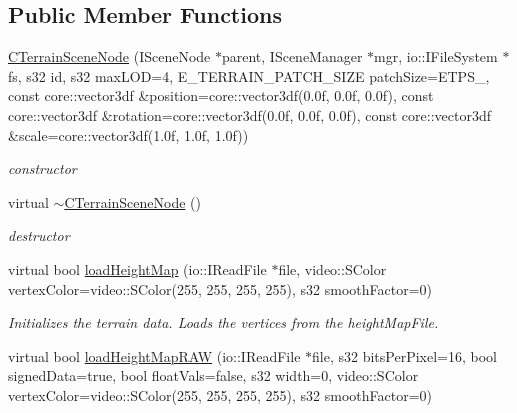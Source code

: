 \subsection*{Public Member Functions}
\begin{DoxyCompactItemize}
\item 
\hyperlink{classirr_1_1scene_1_1_c_terrain_scene_node_abf0c2423999b9658f9ad1e3bba086720}{C\-Terrain\-Scene\-Node} (I\-Scene\-Node $\ast$parent, I\-Scene\-Manager $\ast$mgr, io\-::\-I\-File\-System $\ast$fs, s32 id, s32 max\-L\-O\-D=4, E\-\_\-\-T\-E\-R\-R\-A\-I\-N\-\_\-\-P\-A\-T\-C\-H\-\_\-\-S\-I\-Z\-E patch\-Size=E\-T\-P\-S\-\_, const core\-::vector3df \&position=core\-::vector3df(0.\-0f, 0.\-0f, 0.\-0f), const core\-::vector3df \&rotation=core\-::vector3df(0.\-0f, 0.\-0f, 0.\-0f), const core\-::vector3df \&scale=core\-::vector3df(1.\-0f, 1.\-0f, 1.\-0f))
\begin{DoxyCompactList}\small\item\em constructor \end{DoxyCompactList}\item 
\hypertarget{classirr_1_1scene_1_1_c_terrain_scene_node_ac0d97bfc9ff0cf8201bc1121d1172d7b}{virtual \hyperlink{classirr_1_1scene_1_1_c_terrain_scene_node_ac0d97bfc9ff0cf8201bc1121d1172d7b}{$\sim$\-C\-Terrain\-Scene\-Node} ()}\label{classirr_1_1scene_1_1_c_terrain_scene_node_ac0d97bfc9ff0cf8201bc1121d1172d7b}

\begin{DoxyCompactList}\small\item\em destructor \end{DoxyCompactList}\item 
\hypertarget{classirr_1_1scene_1_1_c_terrain_scene_node_ae3734e983126fd07beb8e769589162c2}{virtual bool \hyperlink{classirr_1_1scene_1_1_c_terrain_scene_node_ae3734e983126fd07beb8e769589162c2}{load\-Height\-Map} (io\-::\-I\-Read\-File $\ast$file, video\-::\-S\-Color vertex\-Color=video\-::\-S\-Color(255, 255, 255, 255), s32 smooth\-Factor=0)}\label{classirr_1_1scene_1_1_c_terrain_scene_node_ae3734e983126fd07beb8e769589162c2}

\begin{DoxyCompactList}\small\item\em Initializes the terrain data. Loads the vertices from the height\-Map\-File. \end{DoxyCompactList}\item 
\hypertarget{classirr_1_1scene_1_1_c_terrain_scene_node_a05faa690ac383a121808e926bbd24a1f}{virtual bool \hyperlink{classirr_1_1scene_1_1_c_terrain_scene_node_a05faa690ac383a121808e926bbd24a1f}{load\-Height\-Map\-R\-A\-W} (io\-::\-I\-Read\-File $\ast$file, s32 bits\-Per\-Pixel=16, bool signed\-Data=true, bool float\-Vals=false, s32 width=0, video\-::\-S\-Color vertex\-Color=video\-::\-S\-Color(255, 255, 255, 255), s32 smooth\-Factor=0)}\label{classirr_1_1scene_1_1_c_terrain_scene_node_a05faa690ac383a121808e926bbd24a1f}


\end{DoxyCompactItemize}
